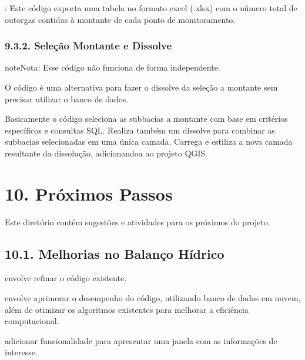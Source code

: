 \documentclass[a4paper,10pt,brazil]{sphinxmanual}
\begin{document}
\sphinxAtStartPar
{}: Este código exporta uma tabela no formato excel (.xlsx) com o número total de outorgas contidas à montante de cada ponto de monitoramento.


\subsubsection{9.3.2. Seleção Montante e Dissolve}
\label{\detokenize{9codigosAuxiliares:selecao-montante-e-dissolve}}
\begin{sphinxadmonition}{note}{Nota:}
\sphinxAtStartPar
Esse código não funciona de forma independente.
\end{sphinxadmonition}

\sphinxAtStartPar
O código  é uma alternativa para fazer o dissolve da seleção a montante sem precisar utilizar o banco de dados.

\sphinxAtStartPar
Basicamente o código seleciona as sub\sphinxhyphen{}bacias a montante com base em critérios específicos e consultas SQL. Realiza também um dissolve para combinar as sub\sphinxhyphen{}bacias selecionadas em uma única camada. Carrega e estiliza a nova camada resultante da dissolução, adicionando\sphinxhyphen{}a ao projeto QGIS.

\sphinxstepscope


\section{10. Próximos Passos}
\label{\detokenize{10proximosPassos:proximos-passos}}\label{\detokenize{10proximosPassos::doc}}
\sphinxAtStartPar
Este diretório contém sugestões e atividades para os próximos do projeto.


\subsection{10.1. Melhorias no Balanço Hídrico}
\label{\detokenize{10proximosPassos:melhorias-no-balanco-hidrico}}
\sphinxAtStartPar
{} envolve refinar o código existente.

\sphinxAtStartPar
{} envolve aprimorar o desempenho do código, utilizando banco de dados em nuvem, além de otimizar os algoritmos existentes para melhorar a eficiência computacional.

\sphinxAtStartPar
{} adicionar funcionalidade para apresentar uma janela com as informações de interesse.
\end{document}
